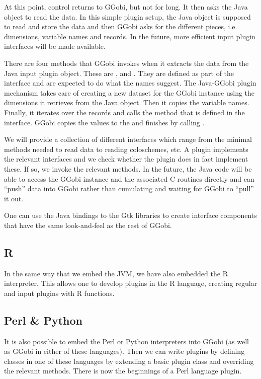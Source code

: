\documentclass{article}
\begin{document}
At this point, control returns to GGobi, but not for long. It then
asks the Java object to read the data.  In this simple plugin setup,
the Java object is supposed to read and store the data and then GGobi
asks for the different pieces, i.e.  dimensions, variable names and
records. In the future, more efficient input plugin interfaces
will be made available.

There are four methods that GGobi invokes when it extracts the data
from the Java input plugin object. These are ,
 and .  They are
defined as part of the  interface and are
expected to do what the names suggest.  The Java-GGobi plugin
mechanism takes care of creating a new dataset for the GGobi instance
using the dimensions it retrieves from the Java object.  Then it
copies the variable names.  Finally, it iterates over the records and
calls the  method that is defined in the
 interface.  GGobi copies the values to
the  and finishes by calling .

We will provide a collection of different interfaces which range from
the minimal methods needed to read data to reading coloschemes, etc.
A plugin implements the relevant interfaces and we check whether the
plugin does in fact implement these. If so, we invoke the relevant
methods.  In the future, the Java code will be able to access the
GGobi instance and the associated C routines directly and can ``push''
data into GGobi rather than cumulating and waiting for GGobi to
``pull'' it out.

One can use the Java bindings to the Gtk libraries to create interface
components that have the same look-and-feel as the rest of GGobi.

\subsection{R}

In the same way that we embed the JVM, we have also embedded the R
interpreter.  This allows one to develop plugins in the R language,
creating regular and input plugins with R functions.

\subsection{Perl \&  Python}

It is also possible to embed the Perl or Python interpreters into
GGobi (as well as GGobi in either of these languages).  Then we can
write plugins by defining classes in one of these languages by
extending a basic plugin class and overriding the relevant methods.
There is now the beginnings of a Perl language plugin.
\end{document}
